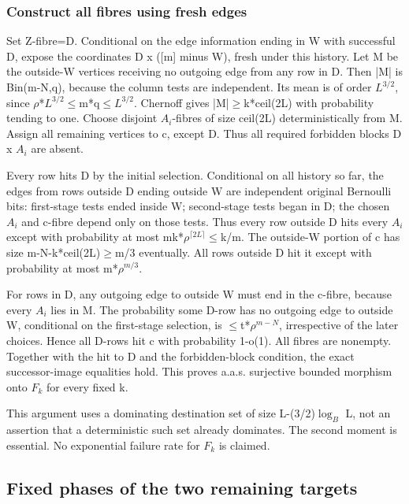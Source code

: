 \documentclass[11pt]{article}
\begin{document}
\subsubsection{Construct all fibres using fresh edges}

Set Z-fibre=D. Conditional on the edge information ending in W with successful D, expose the coordinates D x ([m] minus W), fresh under this history. Let M be the outside-W vertices receiving no outgoing edge from any row in D. Then |M| is Bin(m-N,q), because the column tests are independent. Its mean is of order $L^{3/2}$, since $\rho$*$L^{3/2}$\ensuremath{\leq}m*q\ensuremath{\leq}$L^{3/2}$. Chernoff gives |M|\ensuremath{\geq}k*ceil(2L) with probability tending to one. Choose disjoint $A_{i}$-fibres of size ceil(2L) deterministically from M. Assign all remaining vertices to c, except D. Thus all required forbidden blocks D x $A_{i}$ are absent.

Every row hits D by the initial selection. Conditional on all history so far, the edges from rows outside D ending outside W are independent original Bernoulli bits: first-stage tests ended inside W; second-stage tests began in D; the chosen $A_{i}$ and c-fibre depend only on those tests. Thus every row outside D hits every $A_{i}$ except with probability at most mk*$\rho^{\lceil2L\rceil}$\ensuremath{\leq}k/m. The outside-W portion of c has size m-N-k*ceil(2L)\ensuremath{\geq}m/3 eventually. All rows outside D hit it except with probability at most m*$\rho^{m/3}$.

For rows in D, any outgoing edge to outside W must end in the c-fibre, because every $A_{i}$ lies in M. The probability some D-row has no outgoing edge to outside W, conditional on the first-stage selection, is \ensuremath{\leq}t*$\rho^{m-N}$, irrespective of the later choices. Hence all D-rows hit c with probability 1-o(1). All fibres are nonempty. Together with the hit to D and the forbidden-block condition, the exact successor-image equalities hold. This proves a.a.s. surjective bounded morphism onto $F_{k}$ for every fixed k.

This argument uses a dominating destination set of size L-(3/2)$\log_B$ L, not an assertion that a deterministic such set already dominates. The second moment is essential. No exponential failure rate for $F_{k}$ is claimed.

\subsection{Fixed phases of the two remaining targets}
\end{document}
